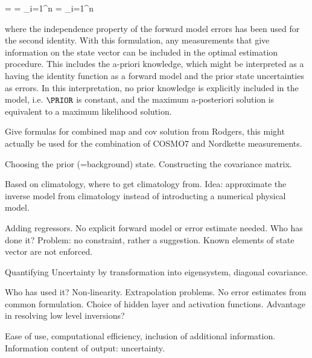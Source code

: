         \startformula
        \startalign[n=2,align={right,left}]
            \NC {} =
                \NC {} \NR
            \NC = \NC {} \prod_{i=1}^n  \NR
            \NC = \NC {}
                \prod_{i=1}^n  \EQCOMMA \NR
        \stopalign
        \stopformula

        where the independence property of the forward model errors has been
        used for the second identity. With this formulation, any measurements
        that give information on the state vector can be included in the
        optimal estimation procedure. This includes the a-priori knowledge,
        which might be interpreted as a  having
        the identity function as a forward model and the prior state
        uncertainties as errors. In this interpretation, no prior knowledge
        is explicitly included in the model, i.e. $\PRIOR$ is constant, and the
        maximum a-posteriori solution is equivalent to a maximum likelihood
        solution.

        Give formulas for combined map and cov solution from Rodgers, this
        might actually be used for the combination of COSMO7 and Nordkette
        measurements.
        
    \stopsubsection

    \startsubsection[title={Constructing the Prior},reference=ch:construct_prior]

        Choosing the prior (=background) state. Constructing the covariance
        matrix.

    \stopsubsection

\stopsection


\startsection[title=Linear Regression]

    Based on climatology, where to get climatology from. Idea: approximate
    the inverse model from climatology instead of introducting a numerical
    physical model.

    Adding regressors. No explicit forward model or error estimate needed.
    Who has done it? Problem: no constraint, rather a suggestion. Known
    elements of state vector are not enforced.
    
    Quantifying Uncertainty by transformation into eigensystem, diagonal
    covariance.

\stopsection


\startsection[title=Neural Network Regression]

    Who has used it? Non-linearity. Extrapolation problems. No error estimates
    from common formulation. Choice of hidden layer and activation functions.
    Advantage in resolving low level inversions?

\stopsection


\startsection[title=Comparison of Techniques]

    Ease of use, computational efficiency, inclusion of additional information.
    Information content of output: uncertainty.

\stopsection


